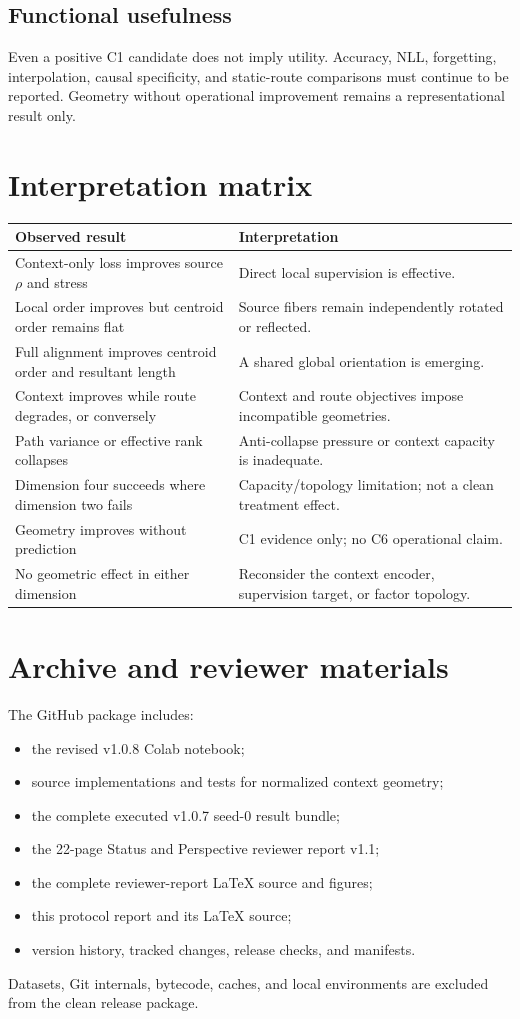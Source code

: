 \documentclass[11pt]{article}
\begin{document}
\subsection{Functional usefulness}
Even a positive C1 candidate does not imply utility. Accuracy, NLL, forgetting, interpolation, causal specificity, and static-route comparisons must continue to be reported. Geometry without operational improvement remains a representational result only.

\section{Interpretation matrix}
\begin{longtable}{p{}p{}}
\toprule
Observed result & Interpretation \\
\midrule
Context-only loss improves source $\rho$ and stress & Direct local supervision is effective. \\
Local order improves but centroid order remains flat & Source fibers remain independently rotated or reflected. \\
Full alignment improves centroid order and resultant length & A shared global orientation is emerging. \\
Context improves while route degrades, or conversely & Context and route objectives impose incompatible geometries. \\
Path variance or effective rank collapses & Anti-collapse pressure or context capacity is inadequate. \\
Dimension four succeeds where dimension two fails & Capacity/topology limitation; not a clean treatment effect. \\
Geometry improves without prediction & C1 evidence only; no C6 operational claim. \\
No geometric effect in either dimension & Reconsider the context encoder, supervision target, or factor topology. \\
\bottomrule
\end{longtable}

\section{Archive and reviewer materials}
The GitHub package includes:
\begin{itemize}
    \item the revised v1.0.8 Colab notebook;
    \item source implementations and tests for normalized context geometry;
    \item the complete executed v1.0.7 seed-0 result bundle;
    \item the 22-page Status and Perspective reviewer report v1.1;
    \item the complete reviewer-report LaTeX source and figures;
    \item this protocol report and its LaTeX source;
    \item version history, tracked changes, release checks, and manifests.
\end{itemize}
Datasets, Git internals, bytecode, caches, and local environments are excluded from the clean release package.
\end{document}
